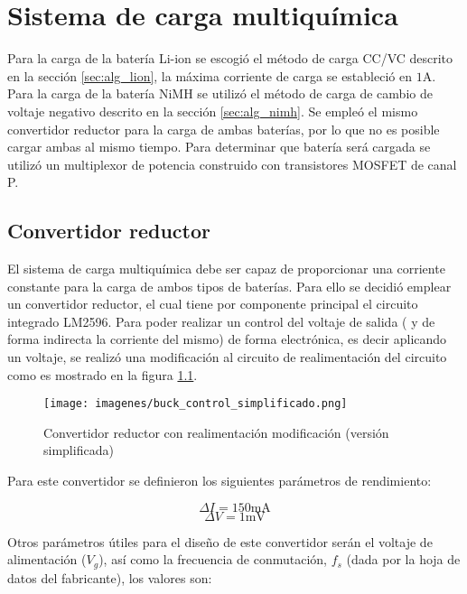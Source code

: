 \chapter{Sistema de carga multiquímica}

Para la carga de la batería Li-ion se escogió el método de carga CC/VC
descrito en la sección \ref{sec:alg_lion}, la máxima corriente de carga
se estableció en $1\text{A}$. Para la carga de la batería NiMH se utilizó
el método de carga de cambio de voltaje negativo descrito en la sección 
\ref{sec:alg_nimh}. Se empleó el mismo convertidor reductor para la carga
de ambas baterías, por lo que no es posible cargar ambas al mismo tiempo.
Para determinar que batería será cargada se utilizó un multiplexor de potencia
construido con transistores MOSFET de canal P.


    \section{Convertidor reductor}

    \label{sec:buck_design}

    El sistema de carga multiquímica debe ser capaz de  proporcionar una 
    corriente constante para la carga de ambos tipos de baterías. Para ello
    se decidió emplear un convertidor reductor, el cual tiene por componente principal
    el circuito integrado LM2596. Para poder realizar un control del voltaje de salida ( y de
    forma indirecta la corriente del mismo)
    de forma electrónica, es decir aplicando un voltaje, se realizó una modificación al circuito
    de realimentación del circuito como es mostrado en la figura \ref{fig:buck_modificado}.

    \begin{figure}[H]
        \centering
        \texttt{[image: imagenes/buck\_control\_simplificado.png]}
        \caption{Convertidor reductor con realimentación modificación (versión simplificada) }
        \label{fig:buck_modificado}
    \end{figure}

    Para este convertidor se definieron los siguientes parámetros de rendimiento:

    $$ \Delta I = 150 \text{mA} $$
    $$ \Delta V = 1 \text{mV}$$

    Otros parámetros útiles para el diseño de este convertidor serán el voltaje
    de alimentación ($V_g$), así como la frecuencia de conmutación, $f_s$ (dada por la hoja 
    de datos del fabricante), los valores son:

